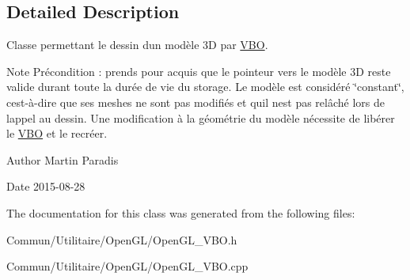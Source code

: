\subsection{Detailed Description}
Classe permettant le dessin d\textquotesingle{}un modèle 3\+D par \hyperlink{classopengl_1_1_v_b_o}{V\+B\+O}. 

\begin{DoxyNote}{Note}
Précondition \+: prends pour acquis que le pointeur vers le modèle 3\+D reste valide durant toute la durée de vie du storage. Le modèle est considéré \char`\"{}constant\char`\"{}, c\textquotesingle{}est-\/à-\/dire que ses meshes ne sont pas modifiés et qu\textquotesingle{}il n\textquotesingle{}est pas relâché lors de l\textquotesingle{}appel au dessin. Une modification à la géométrie du modèle nécessite de libérer le \hyperlink{classopengl_1_1_v_b_o}{V\+B\+O} et le recréer.
\end{DoxyNote}
\begin{DoxyAuthor}{Author}
Martin Paradis 
\end{DoxyAuthor}
\begin{DoxyDate}{Date}
2015-\/08-\/28 
\end{DoxyDate}


The documentation for this class was generated from the following files\+:\begin{DoxyCompactItemize}
\item 
Commun/\+Utilitaire/\+Open\+G\+L/Open\+G\+L\+\_\+\+V\+B\+O.\+h\item 
Commun/\+Utilitaire/\+Open\+G\+L/Open\+G\+L\+\_\+\+V\+B\+O.\+cpp\end{DoxyCompactItemize}
